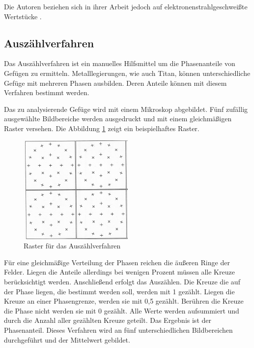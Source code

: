 \documentclass[a4paper, 11pt]{tubsreprt}
\begin{document}
Die Autoren beziehen sich in ihrer Arbeit jedoch auf elektronenstrahlgeschweißte Wertstücke \cite{Shi2013}.
\subsection{Auszählverfahren} \label{Kapitel Auszählverfahren}
Das Auszählverfahren ist ein manuelles Hilfsmittel um die Phasenanteile von Gefügen zu ermitteln. Metalllegierungen, wie auch Titan, können unterschiedliche Gefüge mit mehreren Phasen ausbilden. Deren Anteile können mit diesem Verfahren bestimmt werden.

Das zu analysierende Gefüge wird mit einem Mikroskop abgebildet. Fünf zufällig ausgewählte Bildbereiche werden ausgedruckt und mit einem gleichmäßigen Raster versehen. Die Abbildung \ref{Raster für das Auszählverfahren} zeigt ein beispielhaftes Raster.
\begin{figure} %
\centering
\includegraphics[width=0.5\textwidth]{Bilder/Raster.png}
\caption{Raster für das Auszählverfahren}
\label{Raster für das Auszählverfahren}
\end{figure}

Für eine gleichmäßige Verteilung der Phasen reichen die äußeren Ringe der Felder. Liegen die Anteile allerdings bei wenigen Prozent müssen alle Kreuze berücksichtigt werden. 
Anschließend erfolgt das Auszählen. Die Kreuze die auf der Phase liegen, die bestimmt werden soll, werden mit 1 gezählt. Liegen die Kreuze an einer Phasengrenze, werden sie mit 0,5 gezählt. Berühren die Kreuze die Phase nicht werden sie mit 0 gezählt. Alle Werte werden aufsummiert und durch die Anzahl aller gezählten Kreuze geteilt. Das Ergebnis ist der Phasenanteil. Dieses Verfahren wird an fünf unterschiedlichen Bildbereichen durchgeführt und der Mittelwert gebildet.
\end{document}
